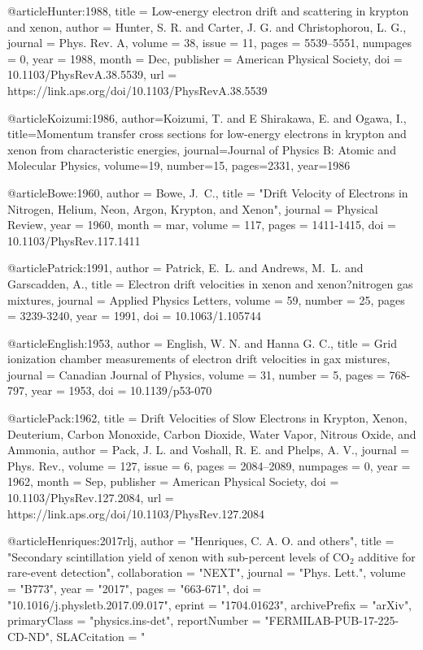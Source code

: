 @article{Hunter:1988,
  title = {Low-energy electron drift and scattering in krypton and xenon},
  author = {Hunter, S. R. and Carter, J. G. and Christophorou, L. G.},
  journal = {Phys. Rev. A},
  volume = {38},
  issue = {11},
  pages = {5539--5551},
  numpages = {0},
  year = {1988},
  month = {Dec},
  publisher = {American Physical Society},
  doi = {10.1103/PhysRevA.38.5539},
  url = {https://link.aps.org/doi/10.1103/PhysRevA.38.5539}
}

@article{Koizumi:1986,
  author={Koizumi, T. and E Shirakawa, E. and Ogawa, I.},
  title={Momentum transfer cross sections for low-energy electrons in krypton and xenon from characteristic energies},
  journal={Journal of Physics B: Atomic and Molecular Physics},
  volume={19},
  number={15},
  pages={2331},
  year={1986}
}

@article{Bowe:1960,
   author = {{Bowe}, J.~C.},
    title = "{Drift Velocity of Electrons in Nitrogen, Helium, Neon, Argon, Krypton, and Xenon}",
  journal = {Physical Review},
     year = 1960,
    month = mar,
   volume = 117,
    pages = {1411-1415},
      doi = {10.1103/PhysRev.117.1411}
}

@article{Patrick:1991,
author = {Patrick, E.~L. and Andrews, M.~L. and Garscadden, A.},
title = {Electron drift velocities in xenon and xenon?nitrogen gas mixtures},
journal = {Applied Physics Letters},
volume = {59},
number = {25},
pages = {3239-3240},
year = {1991},
doi = {10.1063/1.105744}
}

@article{English:1953,
author = {English, W. N. and Hanna G. C.},
title = {Grid ionization chamber measurements of electron drift velocities in gax mistures},
journal = {Canadian Journal of Physics},
volume = {31},
number = {5},
pages = {768-797},
year = {1953},
doi = {10.1139/p53-070}
}

@article{Pack:1962,
  title = {Drift Velocities of Slow Electrons in Krypton, Xenon, Deuterium, Carbon Monoxide, Carbon Dioxide, Water Vapor, Nitrous Oxide, and Ammonia},
  author = {Pack, J. L. and Voshall, R. E. and Phelps, A. V.},
  journal = {Phys. Rev.},
  volume = {127},
  issue = {6},
  pages = {2084--2089},
  numpages = {0},
  year = {1962},
  month = {Sep},
  publisher = {American Physical Society},
  doi = {10.1103/PhysRev.127.2084},
  url = {https://link.aps.org/doi/10.1103/PhysRev.127.2084}
}

@article{Henriques:2017rlj,
      author         = "Henriques, C. A. O. and others",
      title          = "{Secondary scintillation yield of xenon with sub-percent
                        levels of CO$_2$ additive for rare-event detection}",
      collaboration  = "NEXT",
      journal        = "Phys. Lett.",
      volume         = "B773",
      year           = "2017",
      pages          = "663-671",
      doi            = "10.1016/j.physletb.2017.09.017",
      eprint         = "1704.01623",
      archivePrefix  = "arXiv",
      primaryClass   = "physics.ins-det",
      reportNumber   = "FERMILAB-PUB-17-225-CD-ND",
      SLACcitation   = "%
}

